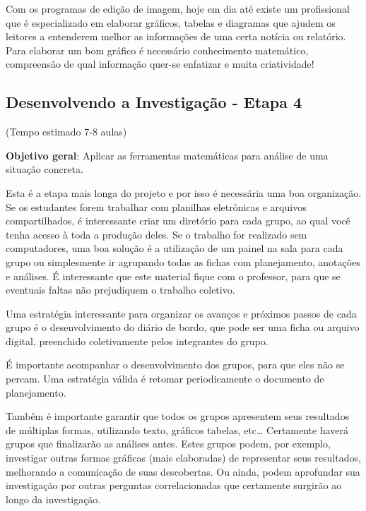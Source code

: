 Com os programas de edição de imagem, hoje em dia até existe um profissional que é especializado em elaborar gráficos, tabelas e diagramas que ajudem os leitores a entenderem melhor as informações de uma certa notícia ou relatório. Para elaborar um bom gráfico é necessário conhecimento matemático, compreensão de qual informação quer-se enfatizar e muita criatividade!
\clearmargin
\def\currentcolor{session2}
\begin{texto}
{\vspace{-\baselineskip}
\subsection{Desenvolvendo a Investigação - Etapa 4}
(Tempo estimado 7-8 aulas)

\textbf{Objetivo geral}: Aplicar as ferramentas matemáticas para análise de uma situação concreta.

Esta é a etapa mais longa do projeto e por isso é necessária uma boa organização. Se os estudantes forem trabalhar com planilhas eletrônicas e arquivos compartilhados, é interessante criar um diretório para cada grupo, ao qual você tenha acesso à toda a produção deles. Se o trabalho for realizado sem computadores, uma boa solução é a utilização de um painel na sala para cada grupo ou simplesmente ir agrupando todas as fichas com planejamento, anotações e análises. É interessante que este material fique com o professor, para que se eventuais faltas não prejudiquem o trabalho coletivo. 

Uma estratégia interessante para organizar os avanços e próximos passos de cada grupo é o desenvolvimento do diário de bordo, que pode ser uma ficha ou arquivo digital, preenchido coletivamente pelos integrantes do grupo. 

É importante acompanhar o desenvolvimento dos grupos, para que eles não se percam. Uma estratégia válida é retomar periodicamente o documento de planejamento.

Também é importante garantir que todos os grupos apresentem seus resultados de múltiplas formas, utilizando texto, gráficos tabelas, etc… Certamente haverá grupos que finalizarão as análises antes. Estes grupos podem, por exemplo, investigar outras formas gráficas (mais elaboradas) de representar seus resultados, melhorando a comunicação de suas descobertas. Ou ainda, podem aprofundar sua investigação por outras perguntas correlacionadas que certamente surgirão ao longo da investigação. 

}
\end{texto}
